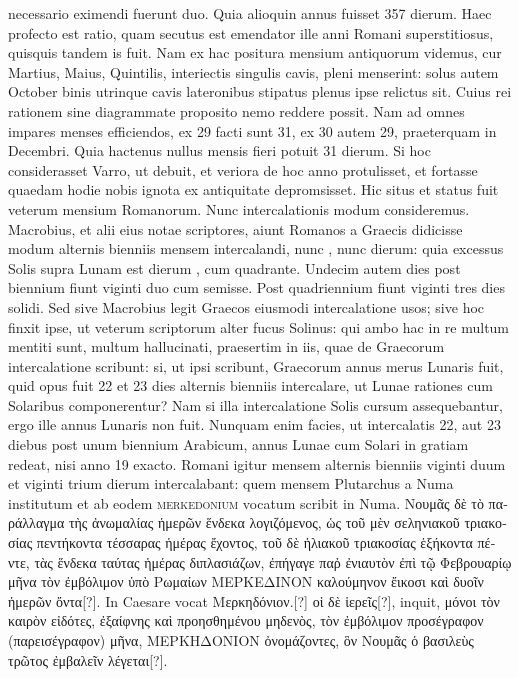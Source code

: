 necessario eximendi fuerunt duo.
Quia alioquin annus fuisset
357 dierum.
Haec profecto est ratio, quam secutus est emendator
ille anni Romani superstitiosus, quisquis tandem is fuit.
Nam ex hac
positura mensium antiquorum videmus, cur Martius, Maius, Quintilis,
interiectis singulis cavis, pleni menserint: solus autem October
binis utrinque cavis lateronibus stipatus plenus ipse relictus sit.
Cuius rei rationem sine diagrammate proposito nemo reddere possit.
Nam ad omnes impares menses efficiendos, ex 29 facti sunt 31,
ex 30 autem 29, praeterquam in Decembri.
Quia hactenus nullus
mensis fieri potuit 31 dierum.
Si hoc considerasset Varro, ut debuit,
et veriora de hoc anno protulisset, et fortasse quaedam hodie nobis
ignota ex antiquitate depromsisset.
Hic situs et status fuit veterum
mensium Romanorum.
Nunc intercalationis modum consideremus.
Macrobius, et alii eius notae scriptores, aiunt Romanos a
Graecis didicisse modum alternis bienniis mensem intercalandi, nunc
, nunc  dierum: quia excessus Solis supra Lunam est
dierum , cum quadrante.
Undecim autem dies post biennium
fiunt viginti duo cum semisse.
Post quadriennium fiunt viginti tres
dies solidi.
Sed sive Macrobius legit Graecos eiusmodi intercalatione
usos; sive hoc finxit ipse, ut veterum scriptorum alter fucus Solinus:
qui ambo hac in re multum mentiti sunt, multum hallucinati,
praesertim in iis, quae de Graecorum intercalatione scribunt: si,
ut ipsi scribunt, Graecorum annus merus Lunaris fuit, quid opus fuit
22 et 23 dies alternis bienniis intercalare, ut Lunae rationes cum Solaribus
componerentur?
Nam si illa intercalatione Solis cursum
assequebantur, ergo ille annus Lunaris non fuit.
Nunquam enim
facies, ut intercalatis 22, aut 23 diebus post unum biennium Arabicum,
annus Lunae cum Solari in gratiam redeat, nisi anno 19 exacto.
Romani igitur mensem alternis bienniis viginti duum et viginti
trium dierum intercalabant: quem mensem Plutarchus a Numa
institutum et ab eodem \textsc{merkedonium} vocatum scribit in
Numa.
\textgreek{Νουμᾶς δὲ τὸ παράλλαγμα τὴς ἀνωμαλίας ἡμερῶν ἕνδεκα
 λογιζόμενος,
ὡς τοῦ μὲν σεληνιακοῦ τριακοσίας πεντήκοντα τέσσαρας ἡμέρας ἔχοντος, τοῦ δὲ
ἡλιακοῦ τριακοσίας ἑξήκοντα πέντε, τὰς ἕνδεκα ταύτας ἡμέρας διπλασιάζων,
 ἐπήγαγε
παῤ ἐνιαυτὸν ἐπὶ τῷ Φεβρουαρίῳ μῆνα τὸν ἐμβόλιμον ὑπὸ Ρωμαίων
ΜΕΡΚΕΔΙΝΟΝ καλούμηνον ἔικοσι καὶ δυοῖν ἡμερῶν ὄντα[?]}.
In Caesare vocat
\textgreek{Μερκηδόνιον.[?]}
\textgreek{οἱ δὲ ἱερεῖς[?]}, inquit, \textgreek{μόνοι τὸν καιρὸν εἰδότες,
 ἐξαίφνης
καὶ προησθημένου μηδενὸς, τὸν ἐμβόλιμον προσέγραφον (παρεισέγραφον)
μῆνα, ΜΕΡΚΗΔΟΝΙΟΝ ὀνομάζοντες, ὃν Νουμᾶς ὁ βασιλεὺς
τρῶτος ἐμβαλεῖν λέγεται[?]}.
